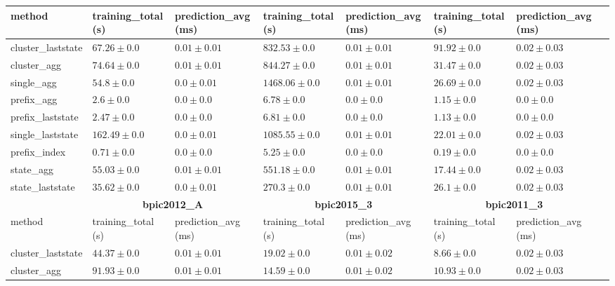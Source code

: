 \documentclass[twoside,11pt]{Latex/Classes/PhDthesisPSnPDF}
\begin{document}
\begin{table}[!htbp]
{\begin{tabular}{llllllll}
			method  & training\_total (s) & prediction\_avg (ms) & training\_total (s) & prediction\_avg (ms) & training\_total (s) & prediction\_avg (ms) \\ \midrule
			cluster\_laststate & $67.26 \pm 0.0$ & $0.01 \pm 0.01$ & $832.53 \pm 0.0$ & $0.01 \pm 0.01$ & $91.92 \pm 0.0$ & $0.02 \pm 0.03$ \\ 
			cluster\_agg & $74.64 \pm 0.0$ & $0.01 \pm 0.01$ & $844.27 \pm 0.0$ & $0.01 \pm 0.01$ & $31.47 \pm 0.0$ & $0.02 \pm 0.03$ \\ 
			single\_agg & $54.8 \pm 0.0$ & $\mathbf{0.0 \pm 0.01}$ & $1468.06 \pm 0.0$ & $0.01 \pm 0.01$ & $26.69 \pm 0.0$ & $0.02 \pm 0.03$ \\ 
			prefix\_agg & $2.6 \pm 0.0$ & $\mathbf{0.0 \pm 0.0}$ & $6.78 \pm 0.0$ & $\mathbf{0.0 \pm 0.0}$ & $1.15 \pm 0.0$ & $\mathbf{0.0 \pm 0.0}$ \\ 
			prefix\_laststate & $2.47 \pm 0.0$ & $\mathbf{0.0 \pm 0.0}$ & $6.81 \pm 0.0$ & $\mathbf{0.0 \pm 0.0}$ & $1.13 \pm 0.0$ & $\mathbf{0.0 \pm 0.0}$ \\ 
			single\_laststate & $162.49 \pm 0.0$ & $\mathbf{0.0 \pm 0.01}$ & $1085.55 \pm 0.0$ & $0.01 \pm 0.01$ & $22.01 \pm 0.0$ & $0.02 \pm 0.03$ \\ 
			prefix\_index & $\mathbf{0.71 \pm 0.0}$ & $\mathbf{0.0 \pm 0.0}$ & $\mathbf{5.25 \pm 0.0}$ & $\mathbf{0.0 \pm 0.0}$ & $\mathbf{0.19 \pm 0.0}$ & $\mathbf{0.0 \pm 0.0}$ \\ 
			state\_agg & $55.03 \pm 0.0$ & $0.01 \pm 0.01$ & $551.18 \pm 0.0$ & $0.01 \pm 0.01$ & $17.44 \pm 0.0$ & $0.02 \pm 0.03$ \\ 
			state\_laststate & $35.62 \pm 0.0$ & $\mathbf{0.0 \pm 0.01}$ & $270.3 \pm 0.0$ & $0.01 \pm 0.01$ & $26.1 \pm 0.0$ & $0.02 \pm 0.03$ \\ 
			\bottomrule
			\toprule
			& \multicolumn{2}{c}{{\bfseries bpic2012\_A}} & \multicolumn{2}{c}{{\bfseries bpic2015\_3}} & \multicolumn{2}{c}{{\bfseries bpic2011\_3}} \\ \cmidrule(lr){2-3} \cmidrule(lr){4-5} \cmidrule(lr){6-7}
			method  & training\_total (s) & prediction\_avg (ms) & training\_total (s) & prediction\_avg (ms) & training\_total (s) & prediction\_avg (ms) \\ \midrule
			cluster\_laststate & $44.37 \pm 0.0$ & $0.01 \pm 0.01$ & $19.02 \pm 0.0$ & $0.01 \pm 0.02$ & $8.66 \pm 0.0$ & $0.02 \pm 0.03$ \\ 
			cluster\_agg & $91.93 \pm 0.0$ & $0.01 \pm 0.01$ & $14.59 \pm 0.0$ & $0.01 \pm 0.02$ & $10.93 \pm 0.0$ & $0.02 \pm 0.03$ \\ 

\end{tabular}}
\end{table}
\end{document}
